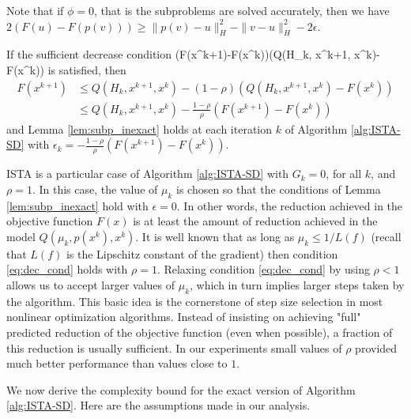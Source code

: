 \documentclass[11pt]{article}
\numberwithin{equation}{section}
\begin{document}
\vskip5mm

Note that if $\phi=0$, that is the subproblems are solved accurately, then we have $2(F(u) - F(p( v))) \geq \|p( v)-u\|_H^2 - \|v-u\|_H^2-2\epsilon$.

If the sufficient decrease  condition 
\bea\label{eq:dec_cond}
(F(x^{k+1})-F(x^k))\leq \rho (Q(H_k, x^{k+1}, x^k)- F(x^k))
\eea
is satisfied, then
\begin{align*}
    F(x^{k+1})
    &\leq Q(H_k, x^{k+1}, x^k)  - (1-\rho) \left( Q(H_k, x^{k+1}, x^k)- F(x^k) \right) \\
    &\leq Q(H_k,  x^{k+1}, x^k)  - \frac{1-\rho}{\rho} (F(x^{k+1})- F(x^k))
\end{align*}
and  Lemma \ref{lem:subp_inexact} holds at each iteration $k$ of Algorithm \ref{alg:ISTA-SD} with  $\epsilon_k=-\frac{1-\rho}{\rho}(F(x^{k+1})- F(x^k))$. 

 ISTA  \cite{Beck2009} is a particular case of Algorithm \ref{alg:ISTA-SD} with $G_k=0$, for all $k$, and $\rho=1$. 
In this case, the value of  $\mu_k$ is chosen so that the conditions of Lemma \ref{lem:subp_inexact} hold with $\epsilon=0$. In other words, the reduction achieved in the objective function $F(x)$ is at least the amount of reduction achieved in the model 
$ Q(\mu_k,p(x^k),x^k)$. It is well known that as long as $\mu_k\leq 1/L(f)$ (recall that $L(f)$ is the Lipschitz constant of the gradient) then  condition \eqref{eq:dec_cond}
 holds with $\rho=1$.  Relaxing condition \eqref{eq:dec_cond} by using $\rho<1$ allows us to accept larger values of $\mu_k$, which in turn implies larger steps taken by the algorithm.   This basic idea is the cornerstone of step size selection in most nonlinear optimization algorithms. Instead of insisting on achieving "full" predicted reduction of the objective function (even when possible), a fraction of this reduction is usually sufficient. In our experiments small values of $\rho$ provided much better performance than values close to $1$. 

We now derive the complexity bound for  the exact version of Algorithm \ref{alg:ISTA-SD}. Here are the assumptions made in our analysis.
\end{document}
